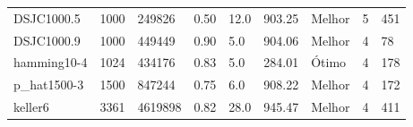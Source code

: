 \begin{table}[h!]
{\begin{tabular}{lllllllll}
			DSJC1000.5 & 1000 & 249826 & 0.50 & 12.0 & 903.25 & Melhor & 5 & 451 \\
			DSJC1000.9 & 1000 & 449449 & 0.90 & 5.0 & 904.06 & Melhor & 4 & 78 \\
			hamming10-4 & 1024 & 434176 & 0.83 & 5.0 & 284.01 & Ótimo & 4 & 178 \\
			p\_hat1500-3 & 1500 & 847244 & 0.75 & 6.0 & 908.22 & Melhor & 4 & 172 \\
			keller6 & 3361 & 4619898 & 0.82 & 28.0 & 945.47 & Melhor & 4 & 411 \\
			\bottomrule
		\end{tabular}
	}{
}
\end{table}